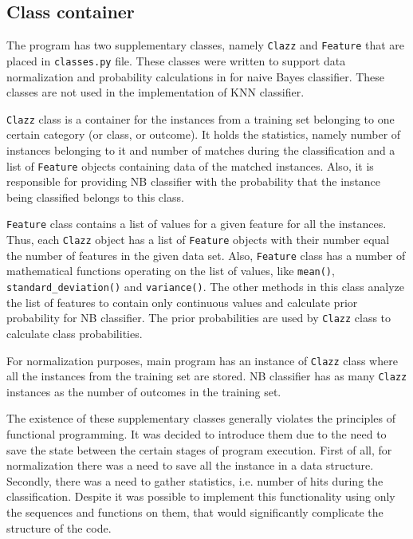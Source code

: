 \documentclass{llncs}
\begin{document}
\subsection{Class container}

The program has two supplementary classes, namely \texttt{Clazz} and \texttt{Feature} that are placed in \texttt{classes.py} file. These classes were written to support data normalization and probability calculations in for naive Bayes classifier. These classes are not used in the implementation of KNN classifier.

\texttt{Clazz} class is a container for the instances from a training set belonging to one certain category (or class, or outcome). It holds the statistics, namely number of instances belonging to it and number of matches during the classification and a list of \texttt{Feature} objects containing data of the matched instances. Also, it is responsible for providing NB classifier with the probability that the instance being classified belongs to this class.

\texttt{Feature} class contains a list of values for a given feature for all the instances. Thus, each \texttt{Clazz} object has a list of \texttt{Feature} objects with their number equal the number of features in the given data set. Also, \texttt{Feature} class has a number of mathematical functions operating on the list of values, like \texttt{mean()}, \texttt{standard\_deviation()} and \texttt{variance()}. The other methods in this class analyze the list of features to contain only continuous values and calculate prior probability for NB classifier. The prior probabilities are used by \texttt{Clazz} class to calculate class probabilities.

For normalization purposes, main program has an instance of \texttt{Clazz} class where all the instances from the training set are stored. NB classifier has as many \texttt{Clazz} instances as the number of outcomes in the training set.

The existence of these supplementary classes generally violates the principles of functional programming. It was decided to introduce them due to the need to save the state between the certain stages of program execution. First of all, for normalization there was a need to save all the instance in a data structure. Secondly, there was a need to gather statistics, i.e. number of hits during the classification. Despite it was possible to implement this functionality using only the sequences and functions on them, that would significantly complicate the structure of the code.
\end{document}
